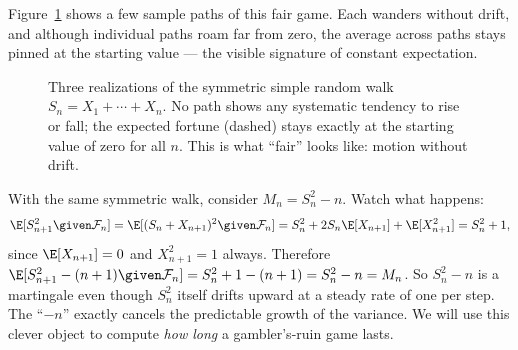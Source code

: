 Figure~\ref{ch28:fig-walk} shows a few sample paths of this fair game. Each wanders without drift, and
although individual paths roam far from zero, the average across paths stays pinned at the starting
value --- the visible signature of constant expectation.

\begin{figure}[H]
\centering
{}
\caption{Three realizations of the symmetric simple random walk $S_n = X_1 + \cdots + X_n$. No path
shows any systematic tendency to rise or fall; the expected fortune (dashed) stays exactly at the
starting value of zero for all $n$. This is what ``fair'' looks like: motion without drift.}
\label{ch28:fig-walk}
\end{figure}

\begin{example}
\label{ch28:ex-variance}
With the same symmetric walk, consider $M_n = S_n^2 - n$. Watch what happens:
\[
  \E[S_{n+1}^2 \given \mathcal{F}_n] = \E[(S_n + X_{n+1})^2 \given \mathcal{F}_n]
  = S_n^2 + 2 S_n \E[X_{n+1}] + \E[X_{n+1}^2] = S_n^2 + 1,
\]
since $\E[X_{n+1}] = 0$ and $X_{n+1}^2 = 1$ always. Therefore
$\E[S_{n+1}^2 - (n+1)\given\mathcal{F}_n] = S_n^2 + 1 - (n+1) = S_n^2 - n = M_n$. So $S_n^2 - n$ is a
martingale even though $S_n^2$ itself drifts upward at a steady rate of one per step. The ``$-n$''
exactly cancels the predictable growth of the variance. We will use this clever object to compute
\emph{how long} a gambler's-ruin game lasts.
\end{example}

